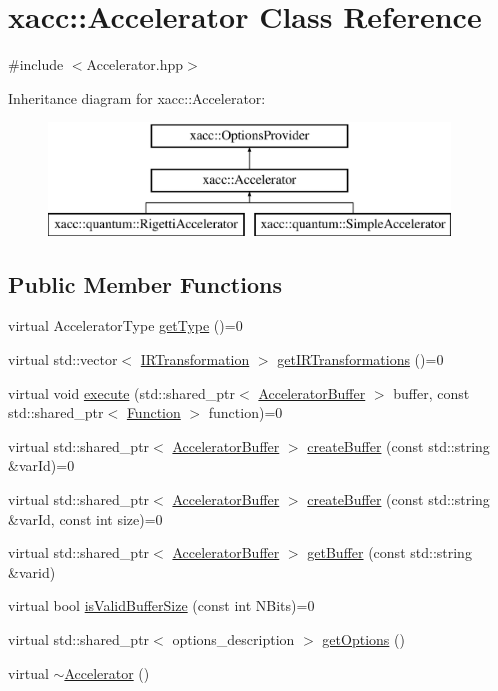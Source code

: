\hypertarget{a00030}{}\section{xacc\+:\+:Accelerator Class Reference}
\label{a00030}


{\ttfamily \#include $<$Accelerator.\+hpp$>$}

Inheritance diagram for xacc\+:\+:Accelerator\+:\begin{figure}[H]
\begin{center}
\leavevmode
\includegraphics[height=3.000000cm]{a00030}
\end{center}
\end{figure}
\subsection*{Public Member Functions}
\begin{DoxyCompactItemize}
\item 
virtual Accelerator\+Type \hyperlink{a00030_aaffc3e4bb9880eb5041b1b58ee4c2665}{get\+Type} ()=0
\item 
virtual std\+::vector$<$ \hyperlink{a00168}{I\+R\+Transformation} $>$ \hyperlink{a00030_ad6e4a642dcb24e552675bcbeff1e1b04}{get\+I\+R\+Transformations} ()=0
\item 
virtual void \hyperlink{a00030_a89b3f3e6294f228abf03a410b0fb1674}{execute} (std\+::shared\+\_\+ptr$<$ \hyperlink{a00032}{Accelerator\+Buffer} $>$ buffer, const std\+::shared\+\_\+ptr$<$ \hyperlink{a00106}{Function} $>$ function)=0
\item 
virtual std\+::shared\+\_\+ptr$<$ \hyperlink{a00032}{Accelerator\+Buffer} $>$ \hyperlink{a00030_aab5046e8d83ab390302e0f49533e95fc}{create\+Buffer} (const std\+::string \&var\+Id)=0
\item 
virtual std\+::shared\+\_\+ptr$<$ \hyperlink{a00032}{Accelerator\+Buffer} $>$ \hyperlink{a00030_a064a2dbd58338364115c260267806945}{create\+Buffer} (const std\+::string \&var\+Id, const int size)=0
\item 
virtual std\+::shared\+\_\+ptr$<$ \hyperlink{a00032}{Accelerator\+Buffer} $>$ \hyperlink{a00030_ab3820be326e28a553fed1a824f4d41d0}{get\+Buffer} (const std\+::string \&varid)
\item 
virtual bool \hyperlink{a00030_ae51584850faeec77299058383977ddeb}{is\+Valid\+Buffer\+Size} (const int N\+Bits)=0
\item 
virtual std\+::shared\+\_\+ptr$<$ options\+\_\+description $>$ \hyperlink{a00030_a98c9eda6b54367c75667ecfbbf167979}{get\+Options} ()
\item 
virtual \hyperlink{a00030_aed88ab0d71b765f0b0f512684ccd4b55}{$\sim$\+Accelerator} ()
\end{DoxyCompactItemize}

